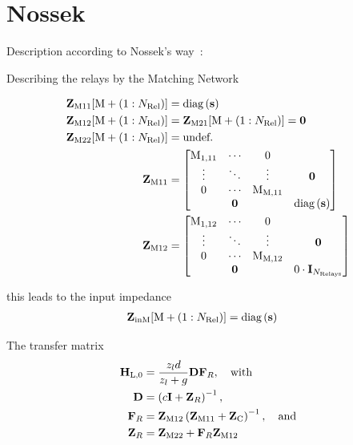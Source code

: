\chapter{Nossek}
\label{sec:nossek}


Description according to Nossek's way~\cite{Nossek}:

Describing the relays by the Matching Network

\begin{align}
\label{eq:nossek_matching}
\mathbf{Z}_\text{M11}[\text{M}+\left(1:N_\text{Rel}\right)] &= \text{diag}\left(\mathbf{s}\right)\\
\mathbf{Z}_\text{M12}[\text{M}+\left(1:N_\text{Rel}\right)] &= 
	\mathbf{Z}_\text{M21}[\text{M}+\left(1:N_\text{Rel}\right)] = \mathbf{0}\\
\mathbf{Z}_\text{M22}[\text{M}+\left(1:N_\text{Rel}\right)] &= \text{undef.}\\
\mathbf{Z}_\text{M11} &=
\begin{bmatrix}
\text{M}_\text{1,11} & \cdots & 0 &\\
 \vdots & \ddots & \vdots & \mathbf{0} \\
 0 & \cdots & \text{M}_\text{M,11}&\\
 & \mathbf{0}& & \text{diag}\left(\mathbf{s}\right)
\end{bmatrix}\\
\mathbf{Z}_\text{M12}&=
\begin{bmatrix}
\text{M}_\text{1,12} & \cdots& 0&\\
\vdots & \ddots & \vdots & \mathbf{0}\\
0 & \cdots & \text{M}_\text{M,12}&\\
& \mathbf{0} &	& 0\cdot\mathbf{I}_{N_\text{Relays}}
\end{bmatrix}
\end{align}

this leads to the input impedance
\begin{align}
\label{eq:nossek_matching}
\mathbf{Z}_\text{inM}[\text{M}+\left(1:N_\text{Rel}\right)] &= \text{diag}\left(\mathbf{s}\right)
\end{align}



The transfer matrix
\begin{align}
\label{eq:nossek_transf}
\mathbf{H}_\text{L,0} &= \frac{z_l d}{z_l + g}\mathbf{D}\mathbf{F}_R,\quad\text{with}\\
\mathbf{D} &= \left(c\mathbf{I} + \mathbf{Z}_R\right)^{-1},\\
\mathbf{F}_R &= \mathbf{Z}_\text{M12}\left(\mathbf{Z}_\text{M11}+\mathbf{Z}_\text{C}\right)^{-1},\quad\text{and}\\
\mathbf{Z}_R &= \mathbf{Z}_\text{M22} + \mathbf{F}_R\mathbf{Z}_\text{M12}
\end{align}

